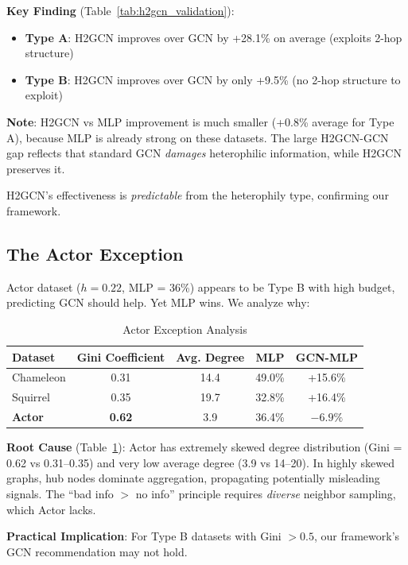 \textbf{Key Finding} (Table~\ref{tab:h2gcn_validation}):
\begin{itemize}
    \item \textbf{Type A}: H2GCN improves over GCN by +28.1\% on average (exploits 2-hop structure)
    \item \textbf{Type B}: H2GCN improves over GCN by only +9.5\% (no 2-hop structure to exploit)
\end{itemize}
\textbf{Note}: H2GCN vs MLP improvement is much smaller (+0.8\% average for Type A), because MLP is already strong on these datasets. The large H2GCN-GCN gap reflects that standard GCN \textit{damages} heterophilic information, while H2GCN preserves it.

H2GCN's effectiveness is \textit{predictable} from the heterophily type, confirming our framework.

\subsection{The Actor Exception}

Actor dataset ($h = 0.22$, MLP = 36\%) appears to be Type B with high budget, predicting GCN should help. Yet MLP wins. We analyze why:

\begin{table}[t]
\centering
\caption{Actor Exception Analysis}
\label{tab:actor_exception}
\begin{tabular}{@{}lcccc@{}}
\toprule
\textbf{Dataset} & \textbf{Gini Coefficient} & \textbf{Avg. Degree} & \textbf{MLP} & \textbf{GCN-MLP} \\
\midrule
Chameleon & 0.31 & 14.4 & 49.0\% & +15.6\% \\
Squirrel & 0.35 & 19.7 & 32.8\% & +16.4\% \\
\textbf{Actor} & \textbf{0.62} & 3.9 & 36.4\% & $-6.9\%$ \\
\bottomrule
\end{tabular}
\end{table}

\textbf{Root Cause} (Table~\ref{tab:actor_exception}): Actor has extremely skewed degree distribution (Gini = 0.62 vs 0.31--0.35) and very low average degree (3.9 vs 14--20). In highly skewed graphs, hub nodes dominate aggregation, propagating potentially misleading signals. The ``bad info $>$ no info'' principle requires \textit{diverse} neighbor sampling, which Actor lacks.

\textbf{Practical Implication}: For Type B datasets with Gini $> 0.5$, our framework's GCN recommendation may not hold.

